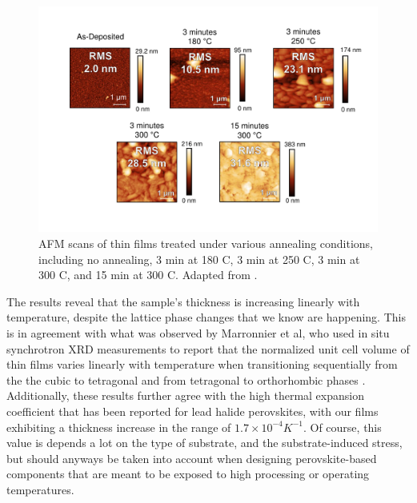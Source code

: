 \begin{figure}[htbp]
  \centering
  \medskip
  \includegraphics[width=1\textwidth]{chapters/ellipsometry/image/afm_all.pdf}
  \caption[AFM scans of  thin films treated under various annealing conditions.]{AFM scans of  thin films treated under various annealing conditions, including no annealing, 3 min at 180 \degree C, 3 min at 250 \degree C, 3 min at 300 \degree C, and 15 min at 300 \degree C. Adapted from \cite{Papadopoulou2024InEllipsometry}.}
  \label{fig:ellipsometry:afm_all}
\end{figure}


The results reveal that the sample's thickness is increasing linearly with temperature, despite the lattice phase changes that we know are happening. This is in agreement with what was observed by Marronnier et al, who used in situ synchrotron XRD measurements to report that the normalized unit cell volume of  thin films varies linearly with temperature when transitioning sequentially from the the cubic to tetragonal and from tetragonal to orthorhombic phases \cite{Marronnier2018AnharmonicityCells}. Additionally, these results further agree with the high thermal expansion coefficient that has been reported for lead halide perovskites, with our films exhibiting a thickness increase in the range of $1.7\times10^{-4}K^{-1}$. Of course, this value is depends a lot on the type of substrate, and the substrate-induced stress, but should anyways be taken into account when designing perovskite-based components that are meant to be exposed to high processing or operating temperatures. 

